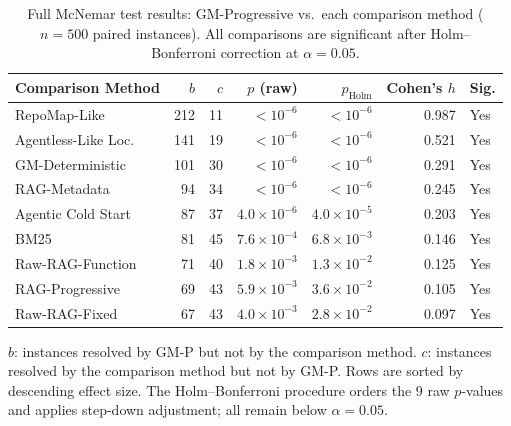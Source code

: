 \begin{table}[t]
\centering
\caption{Full McNemar test results: GM-Progressive vs.\ each comparison method ($n = 500$ paired instances). All comparisons are significant after Holm--Bonferroni correction at $\alpha = 0.05$.}
\label{tab:mcnemar_full}
\small
\begin{tabular}{l r r r r r l}
\toprule
\textbf{Comparison Method} & \textbf{$b$} & \textbf{$c$} & \textbf{$p$ (raw)} & \textbf{$p_{\text{Holm}}$} & \textbf{Cohen's $h$} & \textbf{Sig.} \\
\midrule
RepoMap-Like              & 212 &  11 & $< 10^{-6}$ & $< 10^{-6}$ & 0.987 & Yes \\
Agentless-Like Loc.       & 141 &  19 & $< 10^{-6}$ & $< 10^{-6}$ & 0.521 & Yes \\
GM-Deterministic          & 101 &  30 & $< 10^{-6}$ & $< 10^{-6}$ & 0.291 & Yes \\
RAG-Metadata              &  94 &  34 & $< 10^{-6}$ & $< 10^{-6}$ & 0.245 & Yes \\
Agentic Cold Start        &  87 &  37 & $4.0 \times 10^{-6}$ & $4.0 \times 10^{-5}$ & 0.203 & Yes \\
BM25                      &  81 &  45 & $7.6 \times 10^{-4}$ & $6.8 \times 10^{-3}$ & 0.146 & Yes \\
Raw-RAG-Function          &  71 &  40 & $1.8 \times 10^{-3}$ & $1.3 \times 10^{-2}$ & 0.125 & Yes \\
RAG-Progressive           &  69 &  43 & $5.9 \times 10^{-3}$ & $3.6 \times 10^{-2}$ & 0.105 & Yes \\
Raw-RAG-Fixed             &  67 &  43 & $4.0 \times 10^{-3}$ & $2.8 \times 10^{-2}$ & 0.097 & Yes \\
\bottomrule
\end{tabular}
\vspace{0.5em}

\raggedright
\footnotesize{$b$: instances resolved by GM-P but not by the comparison method. $c$: instances resolved by the comparison method but not by GM-P. Rows are sorted by descending effect size. The Holm--Bonferroni procedure orders the 9 raw $p$-values and applies step-down adjustment; all remain below $\alpha = 0.05$.}
\end{table}

